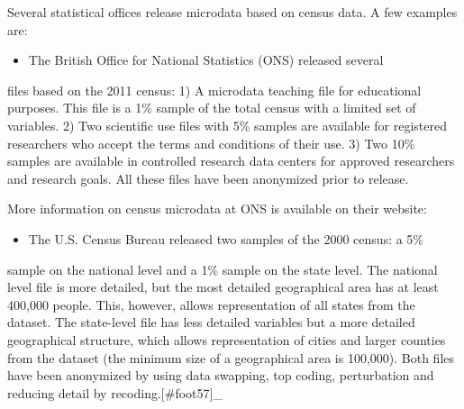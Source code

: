 \documentclass[letterpaper,10pt,english]{sphinxmanual}
\begin{document}
Several statistical offices release microdata based on census data. A
few examples are:
\begin{itemize}
\item {} 
The British Office for National Statistics (ONS) released several

\end{itemize}

files based on the 2011 census: 1) A microdata teaching file for
educational purposes. This file is a 1\% sample of the total census with
a limited set of variables. 2) Two scientific use files with 5\% samples
are available for registered researchers who accept the terms and
conditions of their use. 3) Two 10\% samples are available in controlled
research data centers for approved researchers and research goals. All
these files have been anonymized prior to release. %
\begin{footnote}[23]\sphinxAtStartFootnote
More information on census microdata at ONS is available on their
website:
%
\end{footnote}
\begin{itemize}
\item {} 
The U.S. Census Bureau released two samples of the 2000 census: a 5\%

\end{itemize}

sample on the national level and a 1\% sample on the state level. The
national level file is more detailed, but the most detailed geographical
area has at least 400,000 people. This, however, allows representation
of all states from the dataset. The state-level file has less detailed
variables but a more detailed geographical structure, which allows
representation of cities and larger counties from the dataset (the
minimum size of a geographical area is 100,000). Both files have been
anonymized by using data swapping, top coding, perturbation and reducing
detail by recoding.{[}\#foot57{]}\_
\end{document}
